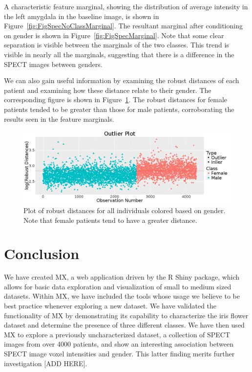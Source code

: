 \documentclass[12pt]{article}
\begin{document}
A characteristic feature marginal, showing the distribution of average intensity in the left amygdala in the baseline image, is shown in Figure~\ref{fig:FigSpecNoClassMarginal}. The resultant marginal after conditioning on gender is shown in Figure~\ref{fig:FigSpecMarginal}. Note that some clear separation is visible between the marginals of the two classes. This trend is visible in nearly all the marginals, suggesting that there is a difference in the SPECT images between genders.

We can also gain useful information by examining the robust distances of each patient and examining how these distance relate to their gender. The corresponding figure is shown in Figure~\ref{fig:FigSpecOutlierPlot}. The robust distances for female patients tended to be greater than those for male patients, corroborating the results seen in the feature marginals.

\begin{figure}[t]
	\centering
	\includegraphics[width=\textwidth,valign=t]{Figures/Spect_Gender/OutlierPlot.png}
	\caption{Plot of robust distances for all individuals colored based on gender. Note that female patients tend to have a greater distance.}
	\label{fig:FigSpecOutlierPlot}
	\hfill
\end{figure}

\section{Conclusion}
\label{sec:conc}

We have created MX, a web application driven by the R Shiny package, which allows for basic data exploration and visualization of small to medium sized datasets. Within MX, we have included the tools whose usage we believe to be best practice whenever exploring a new dataset. We have validated the functionality of MX by demonstrating its capability to characterize the iris flower dataset and determine the presence of three different classes. We have then used MX to explore a previously uncharacterized dataset, a collection of SPECT images from over 4000 patients, and show an interesting association between SPECT image voxel intensities and gender. This latter finding merits further investigation [ADD HERE].
\end{document}
